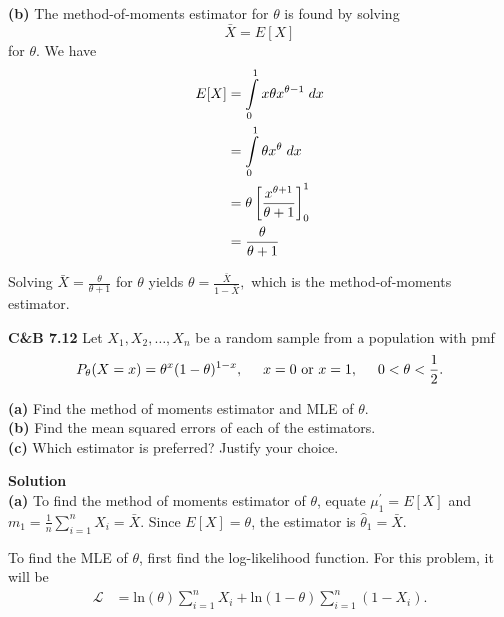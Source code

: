 \documentclass{article}
\newcommand{\mybox}{%
    \collectbox{%
        \setlength{\fboxsep}{1pt}%
        \fbox{\BOXCONTENT}%
    }%
}
\begin{document}
\noindent\textbf{(b)} The method-of-moments estimator for $\theta$ is found by solving $$\bar{X} = E[X]$$ for $\theta$. We have 
\begin{align}
E[X] &= \int\limits_0^1 x \theta x^{\theta - 1} \hspace{1mm} dx \\
&= \int\limits_0^1 \theta x^{\theta} \hspace{1mm} dx \\
&= \theta\left[\frac{x^{\theta+1}}{\theta+1} \right]^1_0 \\
&= \frac{\theta}{\theta + 1}
\end{align}

\noindent Solving $\bar{X} = \frac{\theta}{\theta + 1}$ for $\theta$ yields $\theta = \frac{\bar{X}}{1-\bar{X}},$ which is the method-of-moments estimator.   

\pagebreak

\noindent\mybox{\textbf{C\&B 7.12}}  Let $X_1, X_2, \ldots, X_n$ be a random sample from a population with pmf $$P_{\theta}(X=x) = \theta^x(1-\theta)^{1-x}, \hspace{5mm} x = 0 \text{ or } x = 1, \hspace{5mm} 0<\theta<\frac{1}{2}.$$
\begin{flushleft}
\textbf{(a)} Find the method of moments estimator and MLE of $\theta$.\\
\textbf{(b)} Find the mean squared errors of each of the estimators.\\
\textbf{(c)} Which estimator is preferred? Justify your choice.
\end{flushleft}

\vspace{5mm}

\noindent\mybox{\textbf{Solution}}  \\
\textbf{(a)} To find the method of moments estimator of $\theta$, equate $\mu^{\prime}_1 = E[X]$ and $m_1 = \frac{1} {n}\sum\limits_{i=1}^nX_i = \bar{X}$.  Since $E[X] = \theta$, the estimator is $\hat{\theta}_1 = \bar{X}$.

\vspace{3mm}

\noindent To find the MLE of $\theta$, first find the log-likelihood function.  For this problem, it will be
\begin{align}
\mathscr{L} &= \text{ln}(\theta)\sum\limits_{i=1}^nX_i + \text{ln}(1-\theta)\sum\limits_{i=1}^n(1-X_i).
\end{align}
\end{document}
